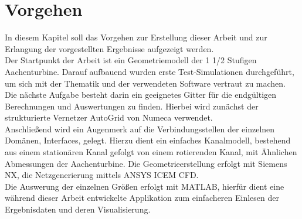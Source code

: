 \chapter{Vorgehen}
In diesem Kapitel soll das Vorgehen zur Erstellung dieser Arbeit und zur Erlangung der vorgestellten Ergebnisse aufgezeigt werden. \\
Der Startpunkt der Arbeit ist ein Geometriemodell der 1 1/2 Stufigen Aachenturbine. Darauf aufbauend wurden erste Test-Simulationen durchgeführt, um sich mit der Thematik und der verwendeten Software vertraut zu machen. Die nächste Aufgabe besteht darin ein geeignetes Gitter für die endgültigen Berechnungen und Auswertungen zu finden. Hierbei wird zunächst der strukturierte Vernetzer AutoGrid von Numeca verwendet.\\
Anschließend wird ein Augenmerk auf die Verbindungsstellen der einzelnen Domänen, Interfaces, gelegt. Hierzu dient ein einfaches Kanalmodell, bestehend aus einem stationären Kanal gefolgt von einem rotierenden Kanal, mit Ähnlichen Abmessungen der Aachenturbine. Die Geometrieerstellung erfolgt mit Siemens NX, die Netzgenerierung mittels ANSYS ICEM CFD.\\ 
Die Auswerung der einzelnen Größen erfolgt mit MATLAB, hierfür dient eine während dieser Arbeit entwickelte Applikation zum einfacheren Einlesen der Ergebnisdaten und deren Visualisierung.    

